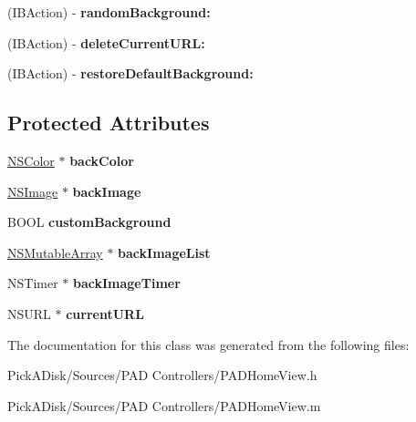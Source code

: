 \begin{DoxyCompactItemize}
\item 
\hypertarget{interface_p_a_d_home_view_a0747565dfe86477c4e78e9bb67b0d303}{
(IBAction) -\/ {\bfseries randomBackground:}}
\label{interface_p_a_d_home_view_a0747565dfe86477c4e78e9bb67b0d303}

\item 
\hypertarget{interface_p_a_d_home_view_ad4ff2e367f11002a7494b3c2ab99d26e}{
(IBAction) -\/ {\bfseries deleteCurrentURL:}}
\label{interface_p_a_d_home_view_ad4ff2e367f11002a7494b3c2ab99d26e}

\item 
\hypertarget{interface_p_a_d_home_view_a3fe3445c40c3da7278f40969a4c48748}{
(IBAction) -\/ {\bfseries restoreDefaultBackground:}}
\label{interface_p_a_d_home_view_a3fe3445c40c3da7278f40969a4c48748}

\end{DoxyCompactItemize}
\subsection*{Protected Attributes}
\begin{DoxyCompactItemize}
\item 
\hypertarget{interface_p_a_d_home_view_a934a84ec9535a4491f78c165948ca43d}{
\hyperlink{class_n_s_color}{NSColor} $\ast$ {\bfseries backColor}}
\label{interface_p_a_d_home_view_a934a84ec9535a4491f78c165948ca43d}

\item 
\hypertarget{interface_p_a_d_home_view_a0d4acdc6c0bab2ebe16736e445f22179}{
\hyperlink{class_n_s_image}{NSImage} $\ast$ {\bfseries backImage}}
\label{interface_p_a_d_home_view_a0d4acdc6c0bab2ebe16736e445f22179}

\item 
\hypertarget{interface_p_a_d_home_view_a1ba468a920584fe0672c2e1c55c486e5}{
BOOL {\bfseries customBackground}}
\label{interface_p_a_d_home_view_a1ba468a920584fe0672c2e1c55c486e5}

\item 
\hypertarget{interface_p_a_d_home_view_aaf200893410479054614973f25cb68da}{
\hyperlink{class_n_s_mutable_array}{NSMutableArray} $\ast$ {\bfseries backImageList}}
\label{interface_p_a_d_home_view_aaf200893410479054614973f25cb68da}

\item 
\hypertarget{interface_p_a_d_home_view_a74ff82f7b9f01320a5e586b43dd29907}{
NSTimer $\ast$ {\bfseries backImageTimer}}
\label{interface_p_a_d_home_view_a74ff82f7b9f01320a5e586b43dd29907}

\item 
\hypertarget{interface_p_a_d_home_view_a0290b5fbeca69a428da607ca1bfbc36f}{
NSURL $\ast$ {\bfseries currentURL}}
\label{interface_p_a_d_home_view_a0290b5fbeca69a428da607ca1bfbc36f}

\end{DoxyCompactItemize}


The documentation for this class was generated from the following files:\begin{DoxyCompactItemize}
\item 
PickADisk/Sources/PAD Controllers/PADHomeView.h\item 
PickADisk/Sources/PAD Controllers/PADHomeView.m\end{DoxyCompactItemize}
